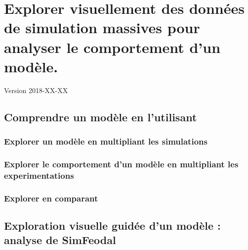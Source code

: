 \chapter{Explorer visuellement des données de simulation massives pour analyser le comportement d'un modèle.} 
\begin{center}
	{\large Version 2018-XX-XX}
\end{center}
\minitoc

%
%
%
%
%
%

\section{Comprendre un modèle en l'utilisant}
\subsection{Explorer un modèle en multipliant les simulations}
\subsection{Explorer le comportement d'un modèle en multipliant les experimentations}
\subsection{Explorer en comparant}

\section{Exploration visuelle guidée d'un modèle : analyse de SimFeodal}
